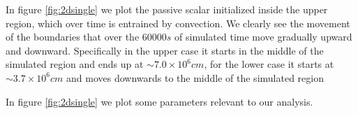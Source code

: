 \begin{figure}[t!]
  \centering
  \centering
  \hfill
  \end{figure}
In figure \ref{fig:2dsingle} we plot the passive scalar initialized inside the upper region, which over time is entrained by convection. We clearly see the movement of the boundaries that over the $60000 s$ of simulated time move gradually upward and downward. Specifically in the upper case it starts in the middle of the simulated region and ends up at $\sim 7.0 \times 10^{6} cm$, for the lower case it starts at $\sim 3.7 \times 10^{6} cm$ and moves downwards to the middle of the simulated region 

In figure \ref{fig:2dsingle} we plot some parameters relevant to our analysis. 

